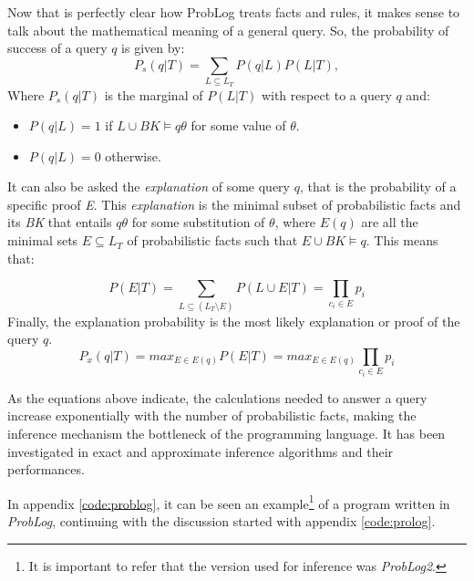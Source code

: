 Now that is perfectly clear how ProbLog treats facts and rules, it makes sense
to talk about the mathematical meaning of a general query. So, the
probability of success of a query $q$ is given by:
\begin{equation}
    \label{eq:query_success}
    P_s(q|T) = \displaystyle\sum_{L \subseteq L_T} P(q|L)P(L|T),
\end{equation}
Where $P_s(q|T)$ is the marginal of $P(L|T)$ with respect to a query $q$ and:
\begin{itemize}
    \item $P(q|L) = 1$ if $L \cup BK \models q\theta$ for some value of
    $\theta$.
    \item $P(q|L) = 0$ otherwise.
\end{itemize}

It can also be asked the \textit{explanation} of some query $q$, that is the
probability of a specific proof \textit{E}. This \textit{explanation} is the
minimal subset of probabilistic facts and its \textit{BK} that entails $q\theta$
for some substitution of $\theta$, where $E(q)$ are all the minimal sets $E
\subseteq L_T$ of probabilistic facts such that $E \cup BK \models q$.
This means that:

\begin{equation}
    P(E|T) = \displaystyle\sum_{L \subseteq (L_T \setminus E)} P(L \cup E|T) =
    \displaystyle\prod_{c_i \in E} p_i
\end{equation}
Finally, the explanation probability is the most likely explanation or proof of
the query $q$.
\begin{equation}
    P_x(q|T) = max_{E \in E(q)} P(E|T) = max_{E \in E(q)}
    \displaystyle\prod_{c_i \in E} p_i
\end{equation}

As the equations above indicate, the calculations needed to answer a query
increase exponentially with the number of probabilistic facts, making the
inference mechanism the bottleneck of the programming language. It has been
investigated in \cite{Kimmig2011} exact and approximate inference algorithms and
their performances.

In appendix \ref{code:problog}, it can be seen an example\footnote{It is
important to refer that the version used for inference was \textit{ProbLog2}.}
of a program written in \textit{ProbLog}, continuing with the discussion started
with appendix \ref{code:prolog}.
